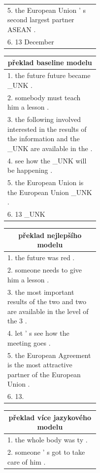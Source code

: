 \begin{figure}[H]
\begin{center}
\begin{tabular}{|p{0.44\linewidth}|}
          5. the European Union ' s second largest partner ASEAN . \\
          6. 13 December \\
          \hline
        \end{tabular}
        \hspace{5mm}
        \begin{tabular}{|p{0.44\linewidth}|}
          \hline
          \multicolumn{1}{|c|}{překlad baseline modelu} \\
          \hline
          1. the future future became \_UNK . \\
          2. somebody must teach him a lesson . \\
          3. the following involved interested in the results of the information and the \_UNK are available in the .\\
          4. see how the \_UNK will be happening . \\
          5. the European Union is the European Union \_UNK . \\
          6. 13 \_UNK \\
          \hline
        \end{tabular}
    \end{center}
    \begin{center}
        \begin{tabular}{|p{0.44\linewidth}|}
          \hline
          \multicolumn{1}{|c|}{překlad nejlepšího modelu} \\
          \hline
          1. the future was red . \\
          2. someone needs to give him a lesson . \\
          3. the most important results of the two and two are available in the level of the 3 . \\
          4. let ' s see how the meeting goes . \\
          5. the European Agreement is the most attractive partner of the European Union . \\
          6. 13. \\
          \hline
        \end{tabular}
        \hspace{3mm}
        \begin{tabular}{|p{0.44\linewidth}|}
          \hline
          \multicolumn{1}{|c|}{překlad více jazykového modelu} \\
          \hline
          1. the whole body was ty . \\
          2. someone ' s got to take care of him . \\

\end{tabular}
\end{center}
\end{figure}
